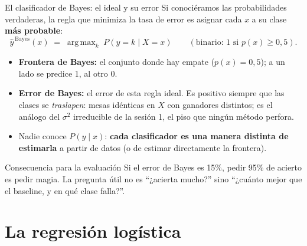 \documentclass{beamer}
\newcommand{\1}{\mathbb{I}}
\DeclareMathOperator*{\argmax}{arg\,max}
\begin{document}
\begin{frame}{El clasificador de Bayes: el ideal y su error}
\small
Si conociéramos las probabilidades verdaderas, la regla que minimiza la tasa de error es asignar cada $x$ a su clase \textbf{más probable}:
\[ \hat{y}^{\,\text{Bayes}}(x) \;=\; \argmax_{k} \; P(y = k \mid X = x) \qquad (\text{binario: } 1 \text{ si } p(x) \geq 0{,}5). \]
\pause
\begin{itemize}\itemsep3pt
  \item \textbf{Frontera de Bayes:} el conjunto donde hay empate ($p(x) = 0{,}5$); a un lado se predice 1, al otro 0. \pause
  \item \textbf{Error de Bayes:} el error de esta regla ideal. Es positivo siempre que las clases se \emph{traslapen}: mesas idénticas en $X$ con ganadores distintos; es el análogo del $\sigma^2$ irreducible de la sesión 1, el piso que ningún método perfora. \pause
  \item Nadie conoce $P(y \mid x)$: \textbf{cada clasificador es una manera distinta de estimarla} a partir de datos (o de estimar directamente la frontera).
\end{itemize}
\pause
\begin{block}{Consecuencia para la evaluación}
Si el error de Bayes es 15\%, pedir 95\% de acierto es pedir magia. La pregunta útil no es ``¿acierta mucho?'' sino ``¿cuánto mejor que el baseline, y en qué clase falla?''.
\end{block}
\end{frame}


\section{La regresión logística}
\begin{frame}[noframenumbering]
\tableofcontents[currentsection]
\end{frame}
\end{document}
